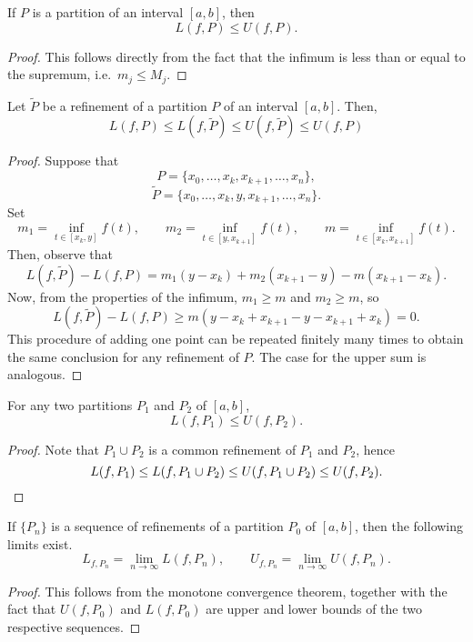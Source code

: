 \documentclass[11pt]{article}
\theoremstyle{definition}
\theoremstyle{remark}
\numberwithin{equation}{module}
\begin{document}
    \begin{lemma}
        If $P$ is a partition of an interval $[a, b]$, then \[
            L(f, P) \leq U(f, P).
        \] 
    \end{lemma}
    \begin{proof}
        This follows directly from the fact that the infimum is less than or equal
        to the supremum, i.e.\ $m_j \leq M_j$.
    \end{proof}
    \begin{theorem}
        Let $\tilde{P}$ be a refinement of a partition $P$ of an interval $[a, b]$.
        Then, \[
            L(f, P) \leq L(f, \tilde{P}) \leq U(f, \tilde{P}) \leq U(f, P)
        \] 
    \end{theorem}
    \begin{proof}
        Suppose that \[
            P = \{x_0, \dots, x_k, x_{k + 1}, \dots, x_n\},
        \] \[
            \tilde{P} = \{x_0, \dots, x_k, y, x_{k + 1}, \dots, x_n\}.
        \] Set \[
            m_1 = \inf_{t \in [x_{k}, y]}f(t), \qquad 
            m_2 = \inf_{t \in [y, x_{k + 1}]}f(t), \qquad
            m = \inf_{t \in [x_k, x_{k + 1}]}f(t).
        \] Then, observe that \[
            L(f, \tilde{P}) - L(f, P) = m_1(y - x_k) + 
            m_2(x_{k + 1} - y) - 
            m(x_{k + 1} - x_k).
        \] Now, from the properties of the infimum, $m_1 \geq m$ and $m_2 \geq m$,
        so \[
            L(f, \tilde{P}) - L(f, P) \geq m(y - x_k + x_{k + 1} - y - x_{k + 1} +
            x_k) = 0.
        \] This procedure of adding one point can be repeated finitely many times to
        obtain the same conclusion for any refinement of $P$. The case for the upper
        sum is analogous.
    \end{proof}

    \begin{corollary}
        For any two partitions $P_1$ and $P_2$ of $[a, b]$, \[
            L(f, P_1) \leq U(f, P_2).
        \] 
    \end{corollary}
    \begin{proof}
        Note that $P_1\cup P_2$ is a common refinement of $P_1$ and $P_2$,
        hence \[
            L(f, P_1) \leq L(f, P_1 \cup P_2) \leq U(f, P_1\cup P_2) \leq U(f, P_2).
            \qedhere
        \] 
    \end{proof}
    \begin{corollary}
        If $\{P_n\}$ is a sequence of refinements of a partition $P_0$ of $[a, b]$,
        then the following limits exist. \[
            L_{f, P_n} = \lim_{n \to \infty} L(f, P_n), \qquad 
            U_{f, P_n} = \lim_{n \to \infty} U(f, P_n). 
        \]
    \end{corollary}
    \begin{proof}
        This follows from the monotone convergence theorem, together with the fact
        that $U(f, P_0)$ and $L(f, P_0)$ are upper and lower bounds of the two
        respective sequences.
    \end{proof}
\end{document}
